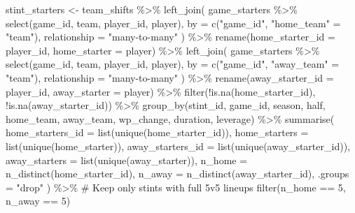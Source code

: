 \documentclass[
  letterpaper,
  DIV=11,
  numbers=noendperiod]{scrartcl}
\newenvironment{Shaded}{\begin{snugshade}}{\end{snugshade}}
\newcommand{\AttributeTok}[1]{\textcolor[rgb]{0.40,0.45,0.13}{#1}}
\newcommand{\CommentTok}[1]{\textcolor[rgb]{0.37,0.37,0.37}{#1}}
\newcommand{\DecValTok}[1]{\textcolor[rgb]{0.68,0.00,0.00}{#1}}
\newcommand{\FunctionTok}[1]{\textcolor[rgb]{0.28,0.35,0.67}{#1}}
\newcommand{\NormalTok}[1]{\textcolor[rgb]{0.00,0.23,0.31}{#1}}
\newcommand{\OtherTok}[1]{\textcolor[rgb]{0.00,0.23,0.31}{#1}}
\newcommand{\SpecialCharTok}[1]{\textcolor[rgb]{0.37,0.37,0.37}{#1}}
\newcommand{\StringTok}[1]{\textcolor[rgb]{0.13,0.47,0.30}{#1}}
\begin{document}
\begin{Shaded}
\begin{Highlighting}[]
\NormalTok{stint\_starters }\OtherTok{\textless{}{-}}\NormalTok{ team\_shifts }\SpecialCharTok{\%\textgreater{}\%}
  \FunctionTok{left\_join}\NormalTok{(}
\NormalTok{    game\_starters }\SpecialCharTok{\%\textgreater{}\%} \FunctionTok{select}\NormalTok{(game\_id, team, player\_id, player),}
    \AttributeTok{by =} \FunctionTok{c}\NormalTok{(}\StringTok{"game\_id"}\NormalTok{, }\StringTok{"home\_team"} \OtherTok{=} \StringTok{"team"}\NormalTok{),}
    \AttributeTok{relationship =} \StringTok{"many{-}to{-}many"}
\NormalTok{  ) }\SpecialCharTok{\%\textgreater{}\%}
  \FunctionTok{rename}\NormalTok{(}\AttributeTok{home\_starter\_id =}\NormalTok{ player\_id, }\AttributeTok{home\_starter =}\NormalTok{ player) }\SpecialCharTok{\%\textgreater{}\%}
  \FunctionTok{left\_join}\NormalTok{(}
\NormalTok{    game\_starters }\SpecialCharTok{\%\textgreater{}\%} \FunctionTok{select}\NormalTok{(game\_id, team, player\_id, player),}
    \AttributeTok{by =} \FunctionTok{c}\NormalTok{(}\StringTok{"game\_id"}\NormalTok{, }\StringTok{"away\_team"} \OtherTok{=} \StringTok{"team"}\NormalTok{),}
    \AttributeTok{relationship =} \StringTok{"many{-}to{-}many"}
\NormalTok{  ) }\SpecialCharTok{\%\textgreater{}\%}
  \FunctionTok{rename}\NormalTok{(}\AttributeTok{away\_starter\_id =}\NormalTok{ player\_id, }\AttributeTok{away\_starter =}\NormalTok{ player) }\SpecialCharTok{\%\textgreater{}\%}
  \FunctionTok{filter}\NormalTok{(}\SpecialCharTok{!}\FunctionTok{is.na}\NormalTok{(home\_starter\_id), }\SpecialCharTok{!}\FunctionTok{is.na}\NormalTok{(away\_starter\_id)) }\SpecialCharTok{\%\textgreater{}\%}
  \FunctionTok{group\_by}\NormalTok{(stint\_id, game\_id, season, half, home\_team, away\_team, wp\_change, duration, leverage) }\SpecialCharTok{\%\textgreater{}\%}
  \FunctionTok{summarise}\NormalTok{(}
    \AttributeTok{home\_starters\_id =} \FunctionTok{list}\NormalTok{(}\FunctionTok{unique}\NormalTok{(home\_starter\_id)),}
    \AttributeTok{home\_starters =} \FunctionTok{list}\NormalTok{(}\FunctionTok{unique}\NormalTok{(home\_starter)),}
    \AttributeTok{away\_starters\_id =} \FunctionTok{list}\NormalTok{(}\FunctionTok{unique}\NormalTok{(away\_starter\_id)),}
    \AttributeTok{away\_starters =} \FunctionTok{list}\NormalTok{(}\FunctionTok{unique}\NormalTok{(away\_starter)),}
    \AttributeTok{n\_home =} \FunctionTok{n\_distinct}\NormalTok{(home\_starter\_id),}
    \AttributeTok{n\_away =} \FunctionTok{n\_distinct}\NormalTok{(away\_starter\_id),}
    \AttributeTok{.groups =} \StringTok{"drop"}
\NormalTok{  ) }\SpecialCharTok{\%\textgreater{}\%}
  \CommentTok{\# Keep only stints with full 5v5 lineups}
  \FunctionTok{filter}\NormalTok{(n\_home }\SpecialCharTok{==} \DecValTok{5}\NormalTok{, n\_away }\SpecialCharTok{==} \DecValTok{5}\NormalTok{)}


\end{Highlighting}
\end{Shaded}
\end{document}
